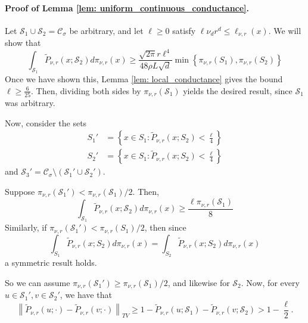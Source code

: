 \documentclass[11pt,twoside]{article}
\newcommand{\set}[1]{\left\{#1\right\}}
\newcommand{\norm}[1]{\left\lVert#1\right\rVert}
\newcommand{\1}{\mathbf{1}}
\newcommand{\Sset}{\mathcal{S}}
\newcommand{\Cset}{\mathcal{C}}
\newcommand{\Csig}{\Cset_{\sigma}}
\begin{document}
\paragraph{Proof of Lemma \ref{lem: uniform_continuous_conductance}.}
Let $\Sset_1 \cup \Sset_2 = \Csig$ be arbitrary, and let $\ell \geq 0$ satisfy $\ell \nu_d r^d  \leq \ell_{\nu,r}(x)$. We will show that 
\begin{equation*}
\int_{\Sset_1} \widetilde{P}_{\nu,r}(x; \Sset_2) d \pi_{\nu,r}(x) \geq \frac{\sqrt{2 \pi} r \ell^4}{48 \rho L \sqrt{d}} \min\set{\pi_{\nu,r}(S_1), \pi_{\nu,r}(S_2)}
\end{equation*}
Once we have shown this, Lemma \ref{lem: local_conductance} gives the bound $\ell \geq \frac{6}{25}$. Then, dividing both sides by $\pi_{\nu,r}(\Sset_1)$ yields the desired result, since $\Sset_1$ was arbitrary.

Now, consider the sets
\begin{align*}
S_1' & = \set{x \in S_1: \widetilde{P}_{\nu,r}(x; S_2) < \frac{\ell}{4}} \\
S_2' & = \set{x \in S_1: \widetilde{P}_{\nu,r}(x; S_2) < \frac{\ell}{4}}
\end{align*}
and $\Sset_3' = \Csig \setminus (\Sset_1' \cup \Sset_2')$. 

Suppose $\pi_{\nu,r}(\Sset_1') < \pi_{\nu,r}(\Sset_1)/2$. Then,
\begin{equation*}
\int_{\Sset_1} \widetilde{P}_{\nu,r}(x; \Sset_2) d \pi_{\nu,r}(x) \geq \frac{\ell  \pi_{\nu,r}(\Sset_1)}{8}
\end{equation*}
Similarly, if $\pi_{\nu,r}(\Sset_1') < \pi_{\nu,r}(S_1)/2$, then since
\begin{equation*}
\int_{S_1} \widetilde{P}_{\nu,r}(x; S_2) d \pi_{\nu,r}(x) = \int_{S_2} \widetilde{P}_{\nu,r}(x; S_2) d \pi_{\nu,r}(x)
\end{equation*}
a symmetric result holds.

So we can assume $\pi_{\nu,r}(\Sset_1') \geq \pi_{\nu,r}(\Sset_1)/2$, and likewise for $\Sset_2$. Now, for every $u \in \Sset_1', v \in \Sset_2'$, we have that
\begin{equation*}
\norm{\widetilde{P}_{\nu,r}(u;\cdot) - \widetilde{P}_{\nu,r}(v;\cdot)}_{TV} \geq 1 - \widetilde{P}_{\nu,r}(u;\Sset_1) - \widetilde{P}_{\nu,r}(v;\Sset_2) > 1 - \frac{\ell}{2}.
\end{equation*}
\end{document}
